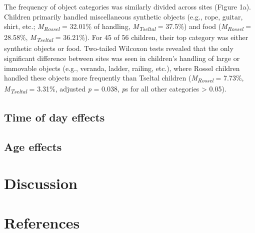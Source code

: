 \documentclass[10pt, letterpaper]{article}
\begin{document}
The frequency of object categories was similarly divided across sites
(Figure 1a). Children primarily handled miscellaneous synthetic objects
(e.g., rope, guitar, shirt, etc.; \emph{M}\textsubscript{\emph{Rossel}}
= 32.01\% of handling, \emph{M}\textsubscript{\emph{Tseltal}} = 37.5\%)
and food (\emph{M}\textsubscript{\emph{Rossel}} = 28.58\%,
\emph{M}\textsubscript{\emph{Tseltal}} = 36.21\%). For 45 of 56
children, their top category was either synthetic objects or food.
Two-tailed Wilcoxon tests revealed that the only significant difference
between sites was seen in children's handling of large or immovable
objects (e.g., veranda, ladder, railing, etc.), where Rossel children
handled these objects more frequently than Tseltal children
(\emph{M}\textsubscript{\emph{Rossel}} = 7.73\%,
\emph{M}\textsubscript{\emph{Tseltal}} = 3.31\%, adjusted \emph{p} =
0.038, \emph{p}s for all other categories \textgreater{} 0.05).

\hypertarget{time-of-day-effects}{%
\subsection{Time of day effects}\label{time-of-day-effects}}

\hypertarget{age-effects}{%
\subsection{Age effects}\label{age-effects}}

\hypertarget{discussion}{%
\section{Discussion}\label{discussion}}

\hypertarget{references}{%
\section{References}\label{references}}

\setlength{\parindent}{-0.1in} 
\setlength{\leftskip}{0.125in}

\noindent


\end{document}
